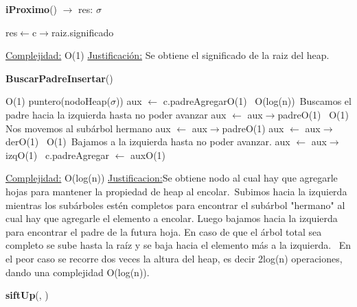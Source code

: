\begin{Representacion}
\begin{Algoritmos}
\begin{algorithm}[H]{\textbf{iProximo}() $\to$ res: $\sigma$}
\begin{algorithmic}[1]
		\State res$\leftarrow$c$\rightarrow$raiz.significado
		
		\medskip
		\Statex \underline{Complejidad:} O(1)
			\Statex \underline{Justificación:} Se obtiene el significado de la raiz del heap.
	\end{algorithmic}
\end{algorithm}

\begin{algorithm}[H]{\textbf{BuscarPadreInsertar}()}
	\begin{algorithmic}[1]
		
		\Comment O(1)
			\State puntero(nodoHeap($\sigma$)) aux $\leftarrow$ c.padreAgregar\Comment O(1)
			\,	
			\Comment O(log(n))\,
				\Comment Buscamos el padre hacia la izquierda hasta no poder avanzar
				\State aux $\leftarrow$ aux$\rightarrow$padre\Comment O(1)		
			\EndWhile
			\,			
			\Comment O(1)\,
				\Comment Nos movemos al subárbol hermano
				\State aux $\leftarrow$ aux$\rightarrow$padre\Comment O(1)
				\State aux $\leftarrow$ aux$\rightarrow$der\Comment O(1)
			\EndIf
			\,			
			\Comment O(1)\,
				\Comment Bajamos a la izquierda hasta no poder avanzar.
				\State aux $\leftarrow$ aux$\rightarrow$izq\Comment O(1)
			\EndWhile
			\,
			\State c.padreAgregar $\leftarrow$ aux\Comment O(1)
		\EndIf
		
		\medskip
		\Statex \underline{Complejidad:} O(log(n))
			\Statex \underline{Justificacion:}Se obtiene nodo al cual hay que agregarle hojas para mantener la propiedad de heap al encolar.\,
			     Subimos hacia la izquierda mientras los subárboles estén completos para encontrar el subárbol "hermano" al cual hay que agregarle el elemento a encolar. Luego bajamos hacia la izquierda para encontrar el padre de la futura hoja. En caso de que el árbol total sea completo se sube hasta la raíz y se baja hacia el elemento más a la izquierda.
			\,   En el peor caso se recorre dos veces la altura del heap, es decir 2log(n) operaciones, dando una complejidad O(log(n)). 
	\end{algorithmic}
\end{algorithm}


\begin{algorithm}[H]{\textbf{siftUp}(, )}
	\begin{algorithmic}[1]
		

\end{algorithmic}
\end{algorithm}
\end{Algoritmos}
\end{Representacion}
